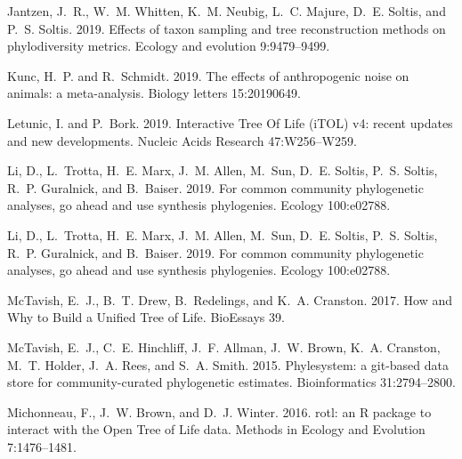 \documentclass[oupdraft]{sysbio_sse}
\begin{document}
\begin{thebibliography}{49}
Jantzen, J.~R., W.~M. Whitten, K.~M. Neubig, L.~C. Majure, D.~E. Soltis, and
  P.~S. Soltis. 2019. Effects of taxon sampling and tree reconstruction methods
  on phylodiversity metrics. Ecology and evolution 9:9479--9499.

Kunc, H.~P. and R.~Schmidt. 2019. The effects of anthropogenic noise on
  animals: a meta-analysis. Biology letters 15:20190649.

Letunic, I. and P.~Bork. 2019. Interactive {Tree} {Of} {Life} ({iTOL}) v4:
  recent updates and new developments. Nucleic Acids Research 47:W256--W259.

Li, D., L.~Trotta, H.~E. Marx, J.~M. Allen, M.~Sun, D.~E. Soltis, P.~S. Soltis,
  R.~P. Guralnick, and B.~Baiser. 2019{}. For common community
  phylogenetic analyses, go ahead and use synthesis phylogenies. Ecology
  100:e02788.

Li, D., L.~Trotta, H.~E. Marx, J.~M. Allen, M.~Sun, D.~E. Soltis, P.~S. Soltis,
  R.~P. Guralnick, and B.~Baiser. 2019{}. For common community
  phylogenetic analyses, go ahead and use synthesis phylogenies. Ecology
  100:e02788.

McTavish, E.~J., B.~T. Drew, B.~Redelings, and K.~A. Cranston. 2017. How and
  {Why} to {Build} a {Unified} {Tree} of {Life}. BioEssays 39.

McTavish, E.~J., C.~E. Hinchliff, J.~F. Allman, J.~W. Brown, K.~A. Cranston,
  M.~T. Holder, J.~A. Rees, and S.~A. Smith. 2015. Phylesystem: a git-based
  data store for community-curated phylogenetic estimates. Bioinformatics
  31:2794--2800.

Michonneau, F., J.~W. Brown, and D.~J. Winter. 2016. rotl: an {R} package to
  interact with the {Open} {Tree} of {Life} data. Methods in Ecology and
  Evolution 7:1476--1481.


\end{thebibliography}
\end{document}
